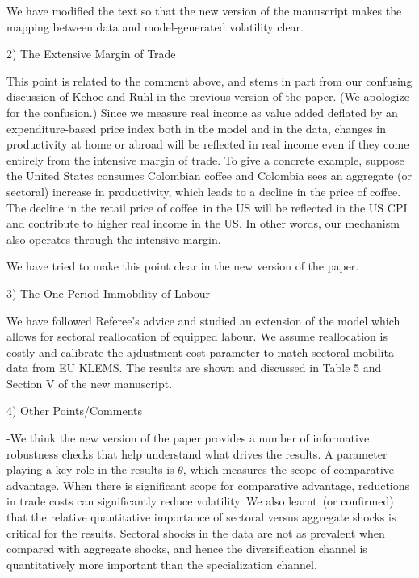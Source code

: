 \documentclass[12pt]{article}
\begin{document}
We have modified the text so that the new version of the manuscript makes
the mapping between data and model-generated volatility clear.

\bigskip

2) The Extensive Margin of Trade

This point is related to the comment above, and stems in part from our
confusing discussion of Kehoe and Ruhl in the previous version of the paper.
(We apologize for the confusion.) Since we measure real income as value
added deflated by an expenditure-based price index both in the model and in
the data, changes in productivity at home or abroad will be reflected in
real income even if they come entirely from the intensive margin of trade.
To give a concrete example, suppose the United States consumes Colombian
coffee and Colombia sees an aggregate (or sectoral) increase in
productivity, which leads to a decline in the price of coffee. The decline
in the retail price of coffee\ in the US will be reflected in the US CPI and
contribute to higher real income in the US. In other words, our mechanism
also operates through the intensive margin.

We have tried to make this point clear in the new version of the paper.

\bigskip

3) The One-Period Immobility of Labour

We have followed Referee's advice and studied an extension of the model
which allows for sectoral reallocation of equipped labour. We assume
reallocation is costly and calibrate the ajdustment cost parameter to match
sectoral mobilita data from EU KLEMS. The results are shown and discussed in
Table 5 and Section V of the new manuscript.

\bigskip

4) Other Points/Comments

-We think the new version of the paper provides a number of informative
robustness checks that help understand what drives the results. A parameter
playing a key role in the results is $\theta $, which measures the scope of
comparative advantage. When there is significant scope for comparative
advantage, reductions in trade costs can significantly reduce volatility. We
also learnt\ (or confirmed) that the relative quantitative importance of
sectoral versus aggregate shocks is critical for the results. Sectoral
shocks in the data are not as prevalent when compared with aggregate shocks,
and hence the diversification channel is quantitatively more important than
the specialization channel.
\end{document}

